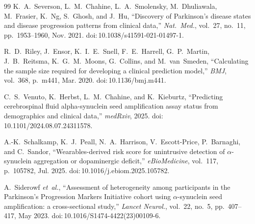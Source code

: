 \documentclass[10pt,letterpaper]{article}
\begin{document}
\begin{thebibliography}{99}
K.~A.~Severson, L.~M.~Chahine, L.~A.~Smolensky, M.~Dhuliawala, M.~Frasier, K.~Ng, S.~Ghosh, and J.~Hu, ``Discovery of Parkinson's disease states and disease progression patterns from clinical data,'' \textit{Nat.\ Med.}, vol.~27, no.~11, pp.~1953--1960, Nov. 2021. doi:\,10.1038/s41591-021-01497-1.

R.~D.~Riley, J.~Ensor, K.~I.~E.~Snell, F.~E.~Harrell, G.~P.~Martin, J.~B.~Reitsma, K.~G.~M.~Moons, G.~Collins, and M.~van~Smeden, ``Calculating the sample size required for developing a clinical prediction model,'' \textit{BMJ}, vol.~368, p.~m441, Mar. 2020. doi:\,10.1136/bmj.m441.

C.~S.~Venuto, K.~Herbst, L.~M.~Chahine, and K.~Kieburtz, ``Predicting cerebrospinal fluid alpha-synuclein seed amplification assay status from demographics and clinical data,'' \textit{medRxiv}, 2025. doi:\,10.1101/2024.08.07.24311578.

A.-K.~Schalkamp, K.~J.~Peall, N.~A.~Harrison, V.~Escott-Price, P.~Barnaghi, and C.~Sandor, ``Wearables-derived risk score for unintrusive detection of $\alpha$-synuclein aggregation or dopaminergic deficit,'' \textit{eBioMedicine}, vol.~117, p.~105782, Jul. 2025. doi:\,10.1016/j.ebiom.2025.105782.

A.~Siderowf \textit{et~al.}, ``Assessment of heterogeneity among participants in the Parkinson's Progression Markers Initiative cohort using $\alpha$-synuclein seed amplification: a cross-sectional study,'' \textit{Lancet Neurol.}, vol.~22, no.~5, pp.~407--417, May 2023. doi:\,10.1016/S1474-4422(23)00109-6.

\end{thebibliography}
\end{document}
